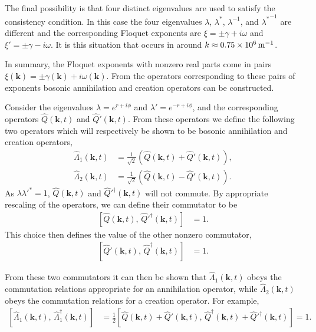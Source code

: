 The final possibility is that four distinct eigenvalues are used to satisfy the consistency condition. In this case the four eigenvalues $\lambda$, $\lambda^*$, $\lambda^{-1}$, and ${\lambda^*}^{-1}$ are different and the corresponding Floquet exponents are $\xi = \pm \gamma + i \omega$ and $\xi' = \pm \gamma - i\omega$. It is this situation that occurs in  around $k \approx \unit[0.75 \times 10^6]{m}^{-1}$.

In summary, the Floquet exponents with nonzero real parts come in pairs $\xi(\bm{k}) = \pm \gamma(\bm{k}) + i \omega(\bm{k})$. From the operators corresponding to these pairs of exponents bosonic annihilation and creation operators can be constructed.

Consider the eigenvalues $\displaystyle \lambda = e^{r + i \phi}$ and $\displaystyle \lambda' = e^{-r + i\phi}$, and the corresponding operators $\hat{Q}(\bm{k}, t)$ and $\hat{Q}'(\bm{k}, t)$. From these operators we define the following two operators which will respectively be shown to be bosonic annihilation and creation operators,
\begin{align}
    \hat{\Lambda}_1(\bm{k}, t) &= \frac{1}{\sqrt{2}} \left( \hat{Q}(\bm{k}, t) + \hat{Q}'(\bm{k}, t)\right),\\
    \hat{\Lambda}_2(\bm{k}, t) &= \frac{1}{\sqrt{2}} \left( \hat{Q}(\bm{k}, t) - \hat{Q}'(\bm{k}, t)\right).
\end{align}
As $\lambda \lambda'^* = 1$, $\hat{Q}(\bm{k}, t)$ and $\hat{Q}'^\dagger(\bm{k}, t)$ will not commute. By appropriate rescaling of the operators, we can define their commutator to be
\begin{align}
    \left[ \hat{Q}(\bm{k}, t),\, \hat{Q}'^\dagger(\bm{k}, t) \right] &= 1.
\end{align}
This choice then defines the value of the other nonzero commutator,
\begin{align}
    \left[ \hat{Q}'(\bm{k}, t),\, \hat{Q}^\dagger(\bm{k}, t) \right] &= 1.
\end{align}

From these two commutators it can then be shown that $\hat{\Lambda}_1(\bm{k}, t)$ obeys the commutation relations appropriate for an annihilation operator, while $\hat{\Lambda}_2(\bm{k}, t)$ obeys the commutation relations for a creation operator. For example,
\begin{align}
    \left[\hat{\Lambda}_1(\bm{k}, t),\, \hat{\Lambda}_1^\dagger(\bm{k}, t) \right] &= \frac{1}{2} \left[ \hat{Q}(\bm{k}, t) + \hat{Q}'(\bm{k}, t),\, \hat{Q}^\dagger(\bm{k}, t) + \hat{Q}'^\dagger(\bm{k}, t)\right] = 1.
\end{align}

